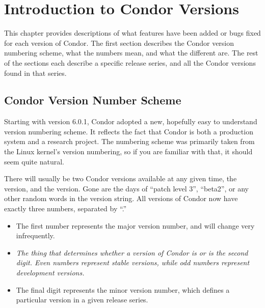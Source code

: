 \section{\label{sec:History-Intro}Introduction to Condor Versions}

This chapter provides descriptions of what features have been added or
bugs fixed for each version of Condor.
The first section describes the Condor version numbering scheme, what
the numbers mean, and what the different  are.
The rest of the sections each describe a specific release series, and
all the Condor versions found in that series.

\subsection{\label{sec:Version-Number-Scheme}
Condor Version Number Scheme}

Starting with version 6.0.1, Condor adopted a new, hopefully easy to
understand version numbering scheme.
It reflects the fact that Condor is both a production system and a
research project.
The numbering scheme was primarily taken from the Linux kernel's
version numbering, so if you are familiar with that, it should seem
quite natural.

There will usually be two Condor versions available at any given time,
the  version, and the  version.
Gone are the days of ``patch level 3'', ``beta2'', or any other random
words in the version string.
All versions of Condor now have exactly three numbers, separated by
``.''   

\begin{itemize}

\item The first number represents the major version number, and will
change very infrequently.

\item \emph{The thing that determines whether a version of Condor is
 or  is the second digit.
Even numbers represent stable versions, while odd numbers represent
development versions.}

\item The final digit represents the minor version number, which
defines a particular version in a given release series.

\end{itemize}


